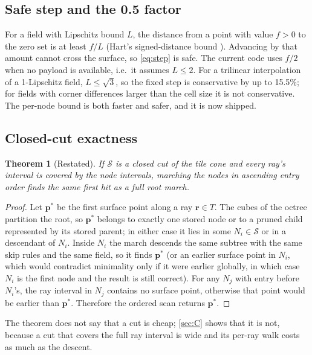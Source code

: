 \documentclass[11pt,a4paper]{article}
\newcommand{\vect}[1]{\mathbf{#1}}
\newcommand{\Lips}{L}
\theoremstyle{plain}
\newtheorem{theorem}{Theorem}
\theoremstyle{definition}
\theoremstyle{remark}
\begin{document}
\subsection{Safe step and the 0.5 factor}

For a field with Lipschitz bound $\Lips$, the distance from a point with value
$f>0$ to the zero set is at least $f/\Lips$ (Hart's signed-distance bound
\cite{hart1996}). Advancing by that amount cannot cross the surface, so
\eqref{eq:step} is safe. The current code uses $f/2$ when no payload is
available, i.e.\ it assumes $\Lips\le2$. For a trilinear interpolation of a
1-Lipschitz field, $\Lips\le\sqrt3$, so the fixed step is conservative by up to
15.5\%; for fields with corner differences larger than the cell size it is not
conservative. The per-node bound is both faster and safer, and it is now
shipped.

\subsection{Closed-cut exactness}

\begin{theorem}[Restated]
If $\mathcal{S}$ is a closed cut of the tile cone and every ray's interval is
covered by the node intervals, marching the nodes in ascending entry order
finds the same first hit as a full root march.
\end{theorem}
\begin{proof}
Let $\vect{p}^*$ be the first surface point along a ray $\vect{r}\in T$. The
cubes of the octree partition the root, so $\vect{p}^*$ belongs to exactly one
stored node or to a pruned child represented by its stored parent; in either
case it lies in some $N_i\in\mathcal{S}$ or in a descendant of $N_i$. Inside
$N_i$ the march descends the same subtree with the same skip rules and the same
field, so it finds $\vect{p}^*$ (or an earlier surface point in $N_i$, which
would contradict minimality only if it were earlier globally, in which case
$N_i$ is the first node and the result is still correct). For any $N_j$ with
entry before $N_i$'s, the ray interval in $N_j$ contains no surface point,
otherwise that point would be earlier than $\vect{p}^*$. Therefore the ordered
scan returns $\vect{p}^*$.
\end{proof}

The theorem does not say that a cut is cheap; \cref{sec:C} shows that it is
not, because a cut that covers the full ray interval is wide and its per-ray
walk costs as much as the descent.
\end{document}
